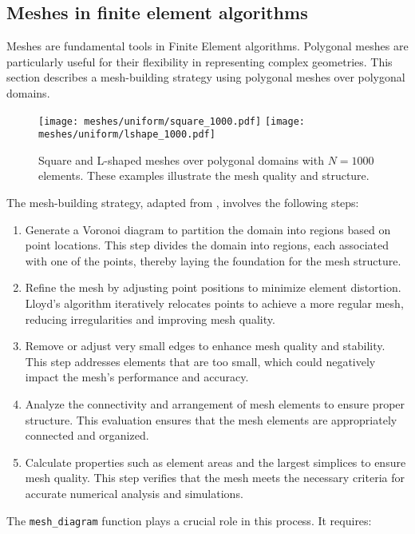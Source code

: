 \subsection{Meshes in finite element algorithms}

Meshes are fundamental tools in Finite Element algorithms. Polygonal meshes are particularly useful for their flexibility in representing complex geometries. This section describes a mesh-building strategy using polygonal meshes over polygonal domains.

\begin{figure}[!ht]
    \centering
    \texttt{[image: meshes/uniform/square\_1000.pdf]}
    \texttt{[image: meshes/uniform/lshape\_1000.pdf]}
    \caption{Square and L-shaped meshes over polygonal domains with $N = 1000$ elements. These examples illustrate the mesh quality and structure.}
\end{figure}

The mesh-building strategy, adapted from \cite{Talischi2012}, involves the following steps:

\begin{enumerate}
    \item Generate a Voronoi diagram to partition the domain into regions based on point locations. This step divides the domain into regions, each associated with one of the points, thereby laying the foundation for the mesh structure.
    \item Refine the mesh by adjusting point positions to minimize element distortion. Lloyd's algorithm iteratively relocates points to achieve a more regular mesh, reducing irregularities and improving mesh quality.
    \item Remove or adjust very small edges to enhance mesh quality and stability. This step addresses elements that are too small, which could negatively impact the mesh's performance and accuracy.
    \item Analyze the connectivity and arrangement of mesh elements to ensure proper structure. This evaluation ensures that the mesh elements are appropriately connected and organized.
    \item Calculate properties such as element areas and the largest simplices to ensure mesh quality. This step verifies that the mesh meets the necessary criteria for accurate numerical analysis and simulations.
\end{enumerate}

The \lstinline{mesh_diagram} function plays a crucial role in this process. It requires:

